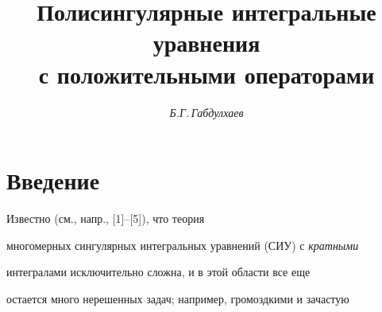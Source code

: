 

\setcounter{page}{7}















\author{\it Б.Г.\,Габдулхаев}




\title{Полисингулярные интегральные уравнения\\ с положительными операторами}





\date{}




\pagestyle{plain} %







\maketitle


\label{begin}














\section*{Введение}





Известно (см., напр., [1]--[5]), что теория


многомерных сингулярных интегральных уравнений (СИУ) с {\it кратными}


интегралами исключительно сложна, и в этой области все еще


остается много нерешенных задач; например, громоздкими и зачастую


